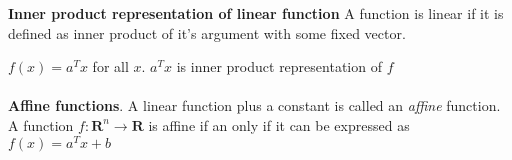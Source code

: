 \documentclass[a4paper, 12pt]{article}
\begin{document}
\textbf{Inner product representation of linear function}
A function is linear if it is defined as inner product of it's argument with some fixed vector.

$f(x) = a^Tx$ for all $x$.
$a^Tx$ is inner product representation of $f$
\\
\\
\textbf{Affine functions}. A linear function plus a constant is called an \textit{affine} function.
A function $f: \mathbf{R} ^n \to \mathbf{R}$ is affine if an only if it can be expressed as $f(x) = a^T x + b$
\end{document}

